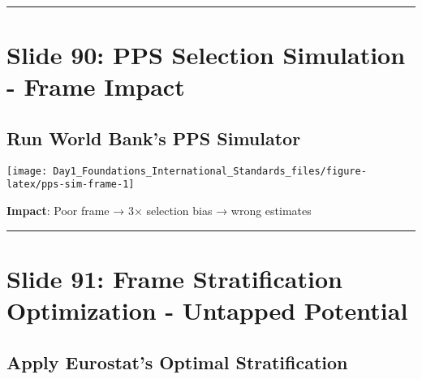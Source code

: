 \documentclass[
]{article}
\begin{document}
\begin{center}\rule{0.5\linewidth}{0.5pt}\end{center}

\section{Slide 90: PPS Selection Simulation - Frame
Impact}\label{slide-90-pps-selection-simulation---frame-impact}

\subsection{Run World Bank's PPS
Simulator}\label{run-world-banks-pps-simulator}

\texttt{[image: Day1\_Foundations\_International\_Standards\_files/figure-latex/pps-sim-frame-1]}

\textbf{Impact}: Poor frame → 3× selection bias → wrong estimates

\begin{center}\rule{0.5\linewidth}{0.5pt}\end{center}

\section{Slide 91: Frame Stratification Optimization - Untapped
Potential}\label{slide-91-frame-stratification-optimization---untapped-potential}

\subsection{Apply Eurostat's Optimal
Stratification}\label{apply-eurostats-optimal-stratification}
\end{document}
